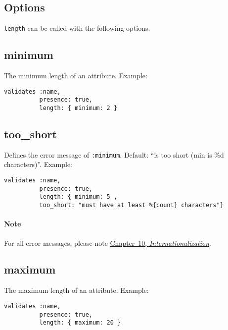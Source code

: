 \documentclass[a4paper]{book}
\begin{document}
\subsection{Options}\label{options-3}

\texttt{length} can be called with the following options.

\subsection{minimum}\label{minimum-1}

The minimum length of an attribute. Example:

\begin{shaded}\begin{verbatim}
validates :name,
          presence: true,
          length: { minimum: 2 }
\end{verbatim}\end{shaded}

\subsection{too\_short}\label{tooux5fshort}

Defines the error message of \texttt{:minimum}. Default: “is too short (min is \%d characters)”. Example:

\begin{shaded}\begin{verbatim}
validates :name,
          presence: true,
          length: { minimum: 5 ,
          too_short: "must have at least %{count} characters"}
\end{verbatim}\end{shaded}

\paragraph{Note}\label{note-27}

For all error messages, please note \hyperref[i18n]{Chapter~10, \emph{Internationalization}}.

\subsection{maximum}\label{maximum-1}

The maximum length of an attribute. Example:

\begin{shaded}\begin{verbatim}
validates :name,
          presence: true,
          length: { maximum: 20 }
\end{verbatim}\end{shaded}
\end{document}
